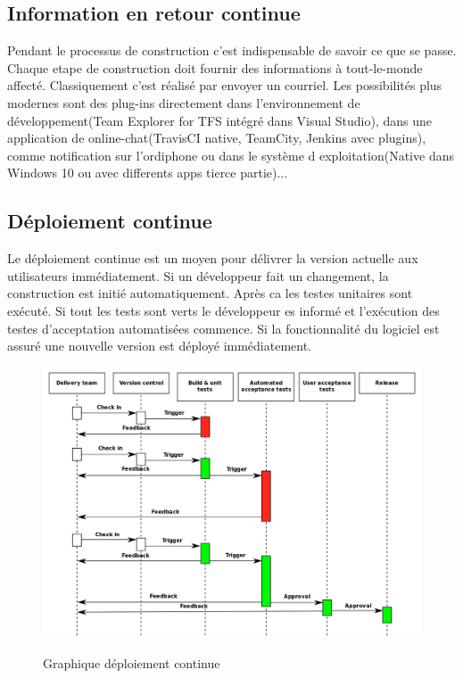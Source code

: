 \subsection{Information en retour continue}

Pendant le processus de construction c'est indispensable de savoir ce que se passe. Chaque etape de construction doit fournir des informations à tout-le-monde affecté. Classiquement c'est réalisé par envoyer un courriel. Les possibilités plus modernes sont des plug-ins directement dans l'environnement de développement(Team Explorer for TFS intégré dans Visual Studio), dans une application de online-chat(TravisCI native, TeamCity, Jenkins avec plugins), comme notification sur l'ordiphone ou dans le système d exploitation(Native dans Windows 10 ou avec differents apps tierce partie)...





\newpage
\subsection{Déploiement continue}

Le déploiement continue est un moyen pour délivrer la version actuelle aux utilisateurs immédiatement. Si un développeur fait un changement, la construction est initié automatiquement. Après ca les testes unitaires sont exécuté. Si tout les tests sont verts le développeur es informé et l'exécution des testes d'acceptation automatisées commence. Si la fonctionnalité du logiciel est assuré une nouvelle version est déployé immédiatement.


\begin{figure}[H]
\centering
\includegraphics[width=15cm]{bilder/Continuous_Delivery}
\caption{Graphique déploiement continue}\cite{wikicd}
\label{fig:continousdelivery}
\end{figure}





